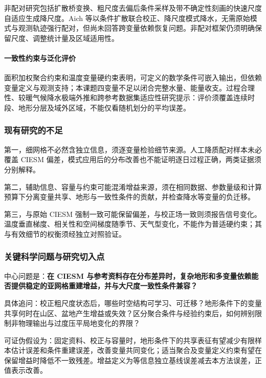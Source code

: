 非配对研究包括扩散桥变换\cite{Bischoff2024Unpaired}、粗尺度去偏后条件采样\cite{Wan2023}及带不确定性刻画的快速尺度自适应生成降尺度\cite{Hess2025Scale}。Aich 等以条件扩散联合校正、降尺度模式降水，无需原始模式与观测轨迹强行配对\cite{Aich2026Diffusion}，但尚未回答跨变量依赖恢复问题。非配对框架仍须明确保留尺度、调整统计量及区域适用性。

\paragraph{一致性约束与泛化评价}
面积加权聚合约束\cite{Geiss2022}和温度变量硬约束\cite{Gonzalez2024Hard}表明，可定义的数学条件可嵌入输出，但依赖变量定义与观测支持；本课题四变量不足以闭合完整水量、能量收支。过程合理性\cite{Maraun2017}、较暖气候降水极端外推\cite{Rampal2024}和跨参考数据集适应性\cite{Pretrain2026}研究提示：评价须覆盖连续时段、地形分层及域外区域，不能仅看随机划分的平均误差。

\subsubsection{现有研究的不足}

第一，细网格不必然含独立信息，须逐变量检验细节来源。人工降质配对样本未必覆盖 CIESM 偏差，模式应用后的分布改善也不能证明逐日过程正确，两类证据须分别解释。

第二，辅助信息、容量与约束可能混淆增益来源，须在相同数据、参数量级和计算预算下分离变量共享、地形与一致性条件的贡献，并检查降水等变量的负迁移。

第三，与原始 CIESM 强制一致可能保留偏差，与校正场一致则须报告信号变化。温度垂直梯度、相关性和空间梯度随季节、天气型变化，不能作为普适硬约束；其与有效细节的权衡须经独立对照验证。

\subsubsection{关键科学问题与研究切入点}

中心问题是：\textbf{在 CIESM 与参考资料存在分布差异时，复杂地形和多变量依赖能否提供稳定的亚网格重建增益，并与大尺度一致性条件兼容？}

具体追问：校正粗尺度状态后，哪些时空结构可学习、可迁移？地形条件下的变量共享何时在山区、盆地产生增益或失效？区分聚合条件与经验约束后，如何辨别限制非物理输出与过度压平局地变化的界限？

可证伪假设为：固定资料、校正与容量时，地形条件下的共享表征有望减少有限样本估计误差和条件重建误差，改善变量共同变化；适当聚合及变量定义约束有望在保留增益时降低不一致残差。增益定义为等信息独立基线误差减去本方法误差，正值表示改善。


